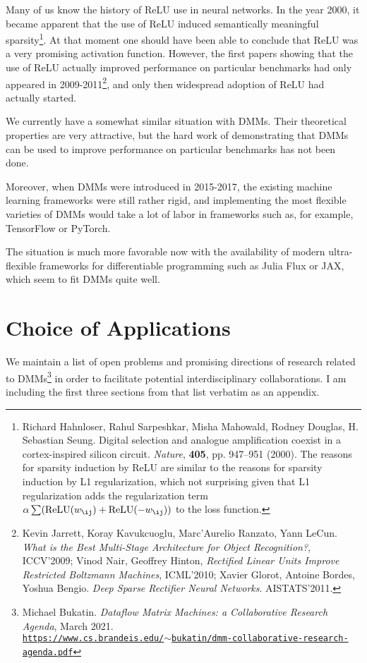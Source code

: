 \documentclass{article}
\begin{document}
Many of us know the history of ReLU use in neural networks. In the year 2000, it became apparent that
the use of ReLU induced semantically meaningful sparsity\footnote{Richard Hahnloser, Rahul Sarpeshkar, 
Misha Mahowald, Rodney Douglas, H. Sebastian Seung. 
Digital selection and analogue amplification coexist in a cortex-inspired silicon circuit.
{\em Nature}, {\bf 405}, pp. 947–951 (2000). The reasons for sparsity induction by ReLU are similar
to the reasons for sparsity induction by L1 regularization, which not surprising given that 
L1 regularization adds the regularization term $\alpha\sum(\mbox{ReLU}(w_{\ij})+\mbox{ReLU}(-w_{\ij}))$ to the loss function.}. At that moment
one should have been able to conclude that ReLU was a very promising activation function.
However, the first papers showing that the use of ReLU actually improved performance on particular
benchmarks had only appeared in 2009-2011\footnote{Kevin Jarrett, Koray Kavukcuoglu, Marc’Aurelio Ranzato, Yann LeCun. {\em What is the Best Multi-Stage Architecture for Object Recognition?}, ICCV'2009; Vinod Nair, Geoffrey Hinton,
{\em Rectified Linear Units Improve Restricted Boltzmann Machines}, ICML'2010; Xavier Glorot, Antoine Bordes, Yoshua Bengio. 
{\em Deep Sparse Rectifier Neural Networks}. AISTATS'2011.}, and only then widespread adoption of ReLU
had actually started.

We currently have a somewhat similar situation with DMMs. Their theoretical properties are very attractive,
but the hard work of demonstrating that DMMs can be used to improve performance on particular benchmarks
has not been done.

Moreover, when DMMs were introduced in 2015-2017, the existing machine learning frameworks
were still rather rigid, and implementing the most flexible varieties of DMMs would take a lot of labor
in frameworks such as, for example, TensorFlow or PyTorch. 

The situation is much more favorable now with
the availability of modern ultra-flexible frameworks for differentiable programming such as Julia Flux or JAX,
which seem to fit DMMs quite well.

\section{Choice of Applications}

We maintain a list of open problems and promising directions of research related to 
DMMs\footnote{Michael Bukatin. {\em Dataflow Matrix Machines:  a Collaborative Research Agenda}, March 2021.\\
\href{https://www.cs.brandeis.edu/~bukatin/dmm-collaborative-research-agenda.pdf}
{\tt https://www.cs.brandeis.edu/$\sim$bukatin/dmm-collaborative-research-agenda.pdf}} in order to facilitate potential
interdisciplinary collaborations. I am including the first three
sections from that list verbatim as an appendix. 
\end{document}
